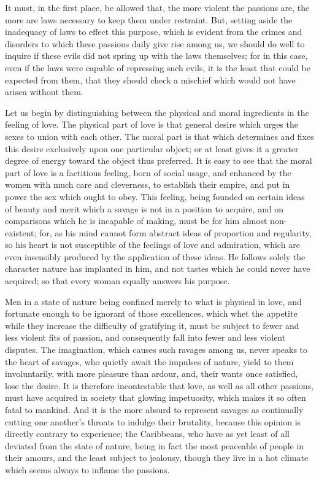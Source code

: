 \documentclass[12pt]{report}
\begin{document}
It must, in the first place, be allowed that, the more violent the passions are, the more are laws necessary to keep them under restraint. But, setting aside the inadequacy of laws to effect this purpose, which is evident from the crimes and disorders to which these passions daily give rise among us, we should do well to inquire if these evils did not spring up with the laws themselves; for in this case, even if the laws were capable of repressing such evils, it is the least that could be expected from them, that they should check a mischief which would not have arisen without them.

Let us begin by distinguishing between the physical and moral ingredients in the feeling of love. The physical part of love is that general desire which urges the sexes to union with each other. The moral part is that which determines and fixes this desire exclusively upon one particular object; or at least gives it a greater degree of energy toward the object thus preferred. It is easy to see that the moral part of love is a factitious feeling, born of social usage, and enhanced by the women with much care and cleverness, to establish their empire, and put in power the sex which ought to obey. This feeling, being founded on certain ideas of beauty and merit which a savage is not in a position to acquire, and on comparisons which he is incapable of making, must be for him almost non-existent; for, as his mind cannot form abstract ideas of proportion and regularity, so his heart is not susceptible of the feelings of love and admiration, which are even insensibly produced by the application of these ideas. He follows solely the character nature has implanted in him, and not tastes which he could never have acquired; so that every woman equally answers his purpose.

Men in a state of nature being confined merely to what is physical in love, and fortunate enough to be ignorant of those excellences, which whet the appetite while they increase the difficulty of gratifying it, must be subject to fewer and less violent fits of passion, and consequently fall into fewer and less violent disputes. The imagination, which causes such ravages among us, never speaks to the heart of savages, who quietly await the impulses of nature, yield to them involuntarily, with more pleasure than ardour, and, their wants once satisfied, lose the desire. It is therefore incontestable that love, as well as all other passions, must have acquired in society that glowing impetuosity, which makes it so often fatal to mankind. And it is the more absurd to represent savages as continually cutting one another's throats to indulge their brutality, because this opinion is directly contrary to experience; the Caribbeans, who have as yet least of all deviated from the state of nature, being in fact the most peaceable of people in their amours, and the least subject to jealousy, though they live in a hot climate which seems always to inflame the passions.
\end{document}
